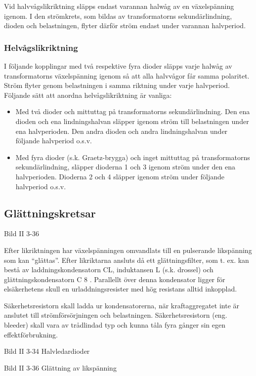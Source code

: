 Vid halvvågslikriktning släpps endast varannan halwåg av en
växelspänning igenom. I den strömkrets, som bildas av transformatorns
sekundärlindning, dioden och belastningen, flyter därför ström endast
under varannan halvperiod.

\subsubsection{Helvågslikriktning}
I följande kopplingar med två respektive fyra dioder släpps varje
halwåg av transformatorns växelspänning igenom så att alla halvvågor
får samma polaritet. Ström flyter genom belastningen i samma riktning
under varje halvperiod. Följande sätt att anordna helvågslikriktning
är vanliga:
\begin{itemize}
\item Med två dioder och mittuttag på transformatorns
  sekundärlindning. Den ena dioden och ena lindningshalvan släpper
  igenom ström till belastningen under ena halvperioden. Den andra
  dioden och andra lindningshalvan under följande halvperiod o.s.v.

\item Med fyra dioder (s.k. Graetz-brygga) och inget mittuttag på
  transformatorns sekundärlindning, släpper dioderna 1 och 3 igenom
  ström under den ena halvperioden.  Dioderna 2 och 4 släpper igenom
  ström under följande halvperiod o.s.v.
\end{itemize}

\subsection{Glättningskretsar}

Bild II 3-36

Efter likriktningen har växelspänningen omvandlats till en pulserande
likspänning som kan ``glättas''. Efter likriktarna ansluts då ett
glättningsfilter, som t. ex. kan bestå av laddningskondensatorn CL,
induktansen L (s.k.  drossel) och glättningskondensatorn C 8 .
Parallellt över denna kondensator ligger för elsäkerhetens skull en
urladdningsresister med hög resistans alltid inkopplad.

Säkerhetsresistorn skall ladda ur kondensatorerna, när kraftaggregatet
inte är anslutet till strömförsörjningen och
belastningen. Säkerhetsresistorn (eng. bleeder) skall vara av
trådlindad typ och kunna tåla fyra gånger sin egen effektförbrukning.

Bild II 3-34 Halvledardioder

Bild II 3-36 Glättning av likspänning

